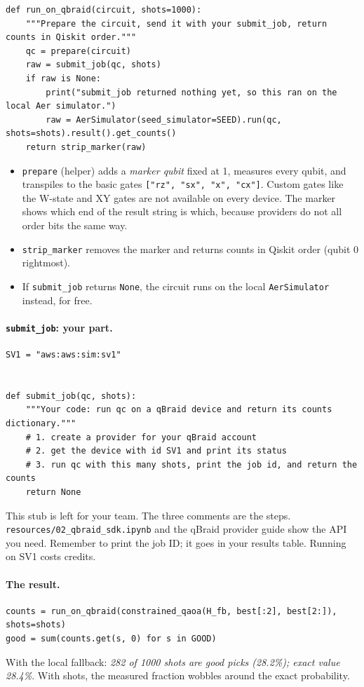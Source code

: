 \documentclass[11pt]{article}
\newcommand{\code}[1]{\texttt{#1}}
\begin{document}
\begin{lstlisting}
def run_on_qbraid(circuit, shots=1000):
    """Prepare the circuit, send it with your submit_job, return counts in Qiskit order."""
    qc = prepare(circuit)
    raw = submit_job(qc, shots)
    if raw is None:
        print("submit_job returned nothing yet, so this ran on the local Aer simulator.")
        raw = AerSimulator(seed_simulator=SEED).run(qc, shots=shots).result().get_counts()
    return strip_marker(raw)
\end{lstlisting}

\begin{itemize}
  \item \code{prepare} (helper) adds a \emph{marker qubit} fixed at 1, measures
        every qubit, and transpiles to the basic gates
        \code{["rz", "sx", "x", "cx"]}. Custom gates like the W-state and XY
        gates are not available on every device. The marker shows which end of
        the result string is which, because providers do not all order bits the
        same way.
  \item \code{strip\_marker} removes the marker and returns counts in Qiskit
        order (qubit 0 rightmost).
  \item If \code{submit\_job} returns \code{None}, the circuit runs on the local
        \code{AerSimulator} instead, for free.
\end{itemize}

\paragraph{\code{submit\_job}: your part.}
\begin{lstlisting}
SV1 = "aws:aws:sim:sv1"


def submit_job(qc, shots):
    """Your code: run qc on a qBraid device and return its counts dictionary."""
    # 1. create a provider for your qBraid account
    # 2. get the device with id SV1 and print its status
    # 3. run qc with this many shots, print the job id, and return the counts
    return None
\end{lstlisting}
This stub is left for your team. The three comments are the steps.
\code{resources/02\_qbraid\_sdk.ipynb} and the qBraid provider guide show the
API you need. Remember to print the job ID; it goes in your results table.
Running on SV1 costs credits.

\paragraph{The result.}
\begin{lstlisting}
counts = run_on_qbraid(constrained_qaoa(H_fb, best[:2], best[2:]), shots=shots)
good = sum(counts.get(s, 0) for s in GOOD)
\end{lstlisting}
With the local fallback: \emph{282 of 1000 shots are good picks (28.2\%); exact
value 28.4\%}. With shots, the measured fraction wobbles around the exact
probability.
\end{document}

